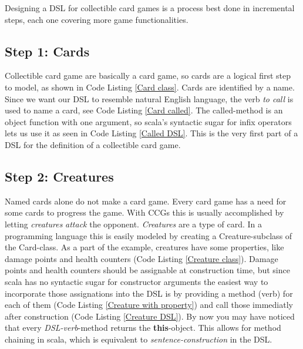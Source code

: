 Designing a DSL for collectible card games is a process best done in incremental steps, each one covering more game functionalities.
\subsection*{Step 1: Cards}
Collectible card game are basically a card game, so cards are a logical first step to model, as shown in Code Listing \ref{Card class}. Cards are identified by a name. Since we want our DSL to resemble natural English language, the verb \textit{to call} is used to name a card, see Code Listing \ref{Card called}. The called-method is an object function with one argument, so scala's syntactic sugar for infix operators lets us use it as seen in Code Listing \ref{Called DSL}. This is the very first part of a DSL for the definition of a collectible card game.

\subsection*{Step 2: Creatures}
Named cards alone do not make a card game. Every card game has a need for some cards to progress the game. With CCGs this is usually accomplished by letting \textit{creatures} \textit{attack} the opponent. \textit{Creatures} are a type of card. In a programming language this is easily modeled by creating a Creature-subclass of the Card-class. As a part of the example, creatures have some properties, like damage points and health counters (Code Listing \ref{Creature class}). Damage points and health counters should be assignable at construction time, but since scala has no syntactic sugar for constructor arguments the easiest way to incorporate those assignations into the DSL is by providing a method (verb) for each of them (Code Listing \ref{Creature with property}) and call those immediatly after construction (Code Listing \ref{Creature DSL}). By now you may have noticed that every \textit{DSL-verb}-method returns the \textbf{this}-object. This allows for method chaining in scala, which is equivalent to \textit{sentence-construction} in the DSL.


